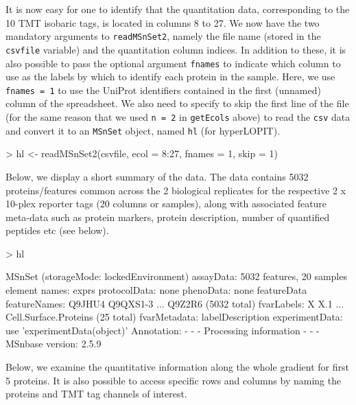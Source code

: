 It is now easy for one to identify that the quantitation data,
corresponding to the 10 TMT isobaric tags, is located in columns 8
to 27. We now have the two mandatory arguments to \texttt{readMSnSet2},
namely the file name (stored in the \texttt{csvfile} variable) and the
quantitation column indices. In addition to these, it is also possible
to pass the optional argument \texttt{fnames} to indicate which column to use
as the labels by which to identify each protein in the sample. Here,
we use \texttt{fnames = 1} to use the UniProt identifiers contained in the
first (unnamed) column of the spreadsheet. We also need to specify to
skip the first line of the file (for the same reason that we used 
\texttt{n = 2} in \texttt{getEcols} above) to read the \texttt{csv} data and convert it to an
\texttt{MSnSet} object, named \texttt{hl} (for hyperLOPIT).

\begin{Schunk}
\begin{Sinput}
> hl <- readMSnSet2(csvfile, ecol = 8:27, fnames = 1, skip = 1)
\end{Sinput}
\end{Schunk}

Below, we display a short summary of the data. The data contains 
5032 proteins/features common across the 2 biological replicates
for the respective 2 x 10-plex reporter tags (20
columns or samples), along with associated feature meta-data such as
protein markers, protein description, number of quantified peptides
etc (see below).


\begin{Schunk}
\begin{Sinput}
> hl
\end{Sinput}
\begin{Soutput}
MSnSet (storageMode: lockedEnvironment)
assayData: 5032 features, 20 samples 
  element names: exprs 
protocolData: none
phenoData: none
featureData
  featureNames: Q9JHU4 Q9QXS1-3 ... Q9Z2R6 (5032 total)
  fvarLabels: X X.1 ... Cell.Surface.Proteins (25 total)
  fvarMetadata: labelDescription
experimentData: use 'experimentData(object)'
Annotation:  
- - - Processing information - - -
 MSnbase version: 2.5.9 
\end{Soutput}
\end{Schunk}

Below, we examine the quantitative information along the whole
gradient for first 5 proteins.  It is also possible to access specific
rows and columns by naming the proteins and TMT tag channels of
interest.

